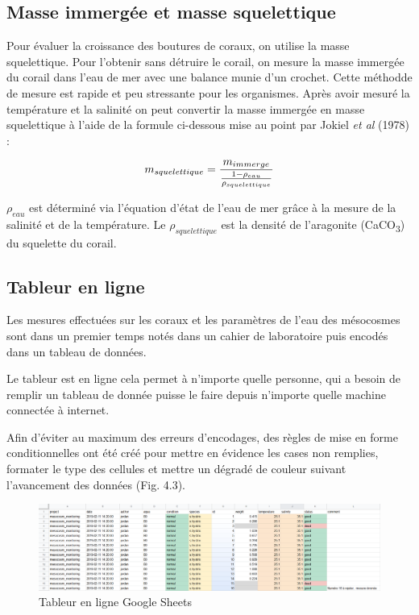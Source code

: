 \documentclass[]{report}
\begin{document}
\subsection{Masse immergée et masse
squelettique}\label{masse-immergee-et-masse-squelettique}

Pour évaluer la croissance des boutures de coraux, on utilise la masse
squelettique. Pour l'obtenir sans détruire le corail, on mesure la masse
immergée du corail dans l'eau de mer avec une balance munie d'un
crochet. Cette méthodde de mesure est rapide et peu stressante pour les
organismes. Après avoir mesuré la température et la salinité on peut
convertir la masse immergée en masse squelettique à l'aide de la formule
ci-dessous mise au point par Jokiel \emph{et al} (1978) :

\begin{equation}
\large
  m_{squelettique} = \frac {m_{immerge}}{ \frac{1 - \rho_{eau}}{ \rho_{squelettique}}}
\end{equation}

\(\rho_{eau}\) est déterminé via l'équation d'état de l'eau de mer grâce
à la mesure de la salinité et de la température. Le
\(\rho_{squelettique}\) est la densité de l'aragonite
(CaCO\textsubscript{3}) du squelette du corail.

\null
\newpage

\subsection{Tableur en ligne}\label{tableur-en-ligne}

Les mesures effectuées sur les coraux et les paramètres de l'eau des
mésocosmes sont dans un premier temps notés dans un cahier de
laboratoire puis encodés dans un tableau de données.

Le tableur est en ligne cela permet à n'importe quelle personne, qui a
besoin de remplir un tableau de donnée puisse le faire depuis n'importe
quelle machine connectée à internet.

Afin d'éviter au maximum des erreurs d'encodages, des règles de mise en
forme conditionnelles ont été créé pour mettre en évidence les cases non
remplies, formater le type des cellules et mettre un dégradé de couleur
suivant l'avancement des données (Fig. 4.3).

\begin{figure}[h!]
\includegraphics[]{../image/tableur-gs.PNG}
\caption{Tableur en ligne Google Sheets}
\end{figure}
\end{document}
